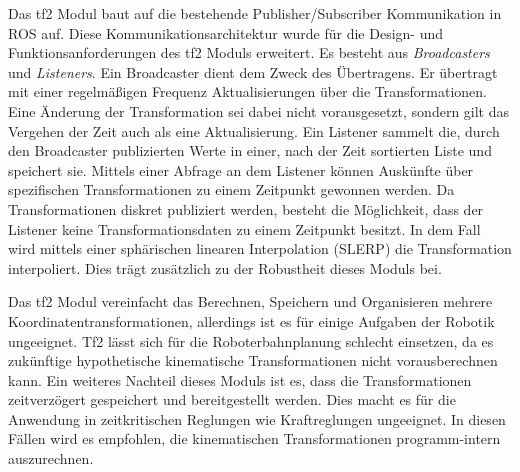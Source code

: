 Das tf2 Modul baut auf die bestehende Publisher/Subscriber Kommunikation in ROS auf. Diese Kommunikationsarchitektur wurde für die Design- und Funktionsanforderungen des tf2 Moduls erweitert. Es besteht aus \emph{Broadcasters} und \emph{Listeners}. Ein Broadcaster dient dem Zweck des Übertragens. Er übertragt mit einer regelmäßigen Frequenz Aktualisierungen über die Transformationen. Eine Änderung der Transformation sei dabei nicht vorausgesetzt, sondern gilt das Vergehen der Zeit auch als eine Aktualisierung. Ein Listener sammelt die, durch den Broadcaster publizierten Werte in einer, nach der Zeit sortierten Liste und speichert sie. Mittels einer Abfrage an dem Listener können Auskünfte über spezifischen Transformationen zu einem Zeitpunkt gewonnen werden. Da Transformationen diskret publiziert werden, besteht die Möglichkeit, dass der Listener keine Transformationsdaten zu einem Zeitpunkt besitzt. In dem Fall wird mittels einer sphärischen linearen Interpolation (SLERP) die Transformation interpoliert. Dies trägt zusätzlich zu der Robustheit dieses Moduls bei. \autocite{Foote_tfPaper_2013} \autocite[161-167]{NewmanWyattS2018ASAt}

Das tf2 Modul vereinfacht das Berechnen, Speichern und Organisieren mehrere Koordinatentransformationen, allerdings ist es für einige Aufgaben der Robotik ungeeignet. Tf2 lässt sich für die Roboterbahnplanung schlecht einsetzen, da es zukünftige hypothetische kinematische Transformationen nicht vorausberechnen kann. Ein weiteres Nachteil dieses Moduls ist es, dass die Transformationen zeitverzögert gespeichert und bereitgestellt werden. Dies macht es für die Anwendung in zeitkritischen Reglungen wie Kraftreglungen ungeeignet. In diesen Fällen wird es empfohlen, die kinematischen Transformationen programm-intern auszurechnen. \autocite[174-175]{NewmanWyattS2018ASAt}

